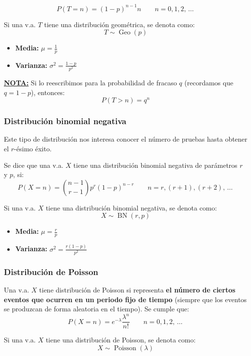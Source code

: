 \documentclass[a4paper]{book}
\numberwithin{figure}{section}
\numberwithin{equation}{subsection}
\numberwithin{figure}{chapter}
\theoremstyle{definition}
\newenvironment{nota}{\underline{\textbf{NOTA:}}}{}
\newcommand{\psus}{\, \ldots \,}
\DeclareMathOperator{\BN}{BN}
\DeclareMathOperator{\Geo}{Geo}
\DeclareMathOperator{\Poisson}{Poisson}
\begin{document}
\[\boxed{P\left( T=n \right)= \left( 1-p \right)^{n-1}n} \qquad n= 0,1,2,\psus\]

Si una v.a. $T$ tiene una distribución geométrica, se denota como: \[T \sim \Geo(p)\]

\begin{itemize}
	\item \textbf{Media:} $\displaystyle{\mu = \frac{1}{p}}$
	\item \textbf{Varianza:} $\displaystyle{\sigma ^2 = \frac{1-p}{p^2}}$
\end{itemize}

\begin{nota}
	Si lo reescribimos para la probabilidad de fracaso $q$ (recordamos que $q = 1-p$), entonces: \[P\left( T>n \right) = q^n\]
\end{nota}

\subsubsection{Distribución binomial negativa}
Este tipo de distribución nos interesa conocer el número de pruebas hasta obtener el $r$-ésimo éxito.

Se dice que una v.a. $X$ tiene una distribución binomial negativa de parámetros $r$ y $p$, si: \[\boxed{P\left( X=n \right)={\binom{n-1}{r-1}} p^r\left( 1-p \right)^{n-r}} \qquad n= r,(r+1),(r+2),\psus \]

Si una v.a. $X$ tiene una distribución binomial negativa, se denota como: \[X \sim \BN \left( r,p \right)\]

\begin{itemize}
	\item \textbf{Media:} $\displaystyle{\mu = \frac{r}{p}}$
	\item \textbf{Varianza:} $\displaystyle{\sigma ^2 = \frac{r(1-p)}{p^2}}$
\end{itemize}

\subsubsection{Distribución de Poisson}
Una v.a. $X$ tiene distribución de Poisson si representa \textbf{el número de ciertos eventos que ocurren en un periodo fijo de tiempo} (siempre que los eventos se produzcan de forma aleatoria en el tiempo). Se cumple que: \[\boxed{P\left( X=n \right)=e^{-\lambda} \frac{\lambda ^n}{n!}} \qquad n= 0,1,2,\psus \]

Si una v.a. $X$ tiene una distribución de Poisson, se denota como: \[X \sim \Poisson \left( \lambda \right)\]
\end{document}

